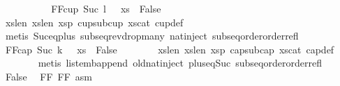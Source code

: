 \begin{isabellebody}
\ \ \ \ \isamarkupfalse%
\isanewline
\isanewline
\ \ \ \ \isamarkupfalse%
\ FF{}{\isacharcolon}{\kern0pt}{\isachardoublequoteopen}cup\ {\isacharparenleft}{\kern0pt}Suc\ {\isacharparenleft}{\kern0pt}l\ {\isacharplus}{\kern0pt}\ {}{\isacharparenright}{\kern0pt}{\isacharparenright}{\kern0pt}\ xs\ {\isasymLongrightarrow}\ False{\isachardoublequoteclose}\ \isanewline
\ \ \ \ \ \ \isamarkupfalse%
\ xs{\isacharunderscore}{\kern0pt}len\ xs{}{\isacharunderscore}{\kern0pt}len{}\ xs{}p{}\ cup{\isacharunderscore}{\kern0pt}sub{\isacharunderscore}{\kern0pt}cup\ xs{\isacharunderscore}{\kern0pt}cat\ cup{\isacharunderscore}{\kern0pt}def\isanewline
\ \ \ \ \ \ \isamarkupfalse%
\ {\isacharparenleft}{\kern0pt}metis\ Suc{\isacharunderscore}{\kern0pt}eq{\isacharunderscore}{\kern0pt}plus{}\ subseq{\isacharunderscore}{\kern0pt}rev{\isacharunderscore}{\kern0pt}drop{\isacharunderscore}{\kern0pt}many\ nat{\isachardot}{\kern0pt}inject\ subseq{\isacharunderscore}{\kern0pt}order{\isachardot}{\kern0pt}order{\isacharunderscore}{\kern0pt}refl{\isacharparenright}{\kern0pt}\isanewline
\isanewline
\ \ \ \ \isamarkupfalse%
\ FF{}{\isacharcolon}{\kern0pt}{\isachardoublequoteopen}cap\ {\isacharparenleft}{\kern0pt}Suc\ {\isacharparenleft}{\kern0pt}k\ {\isacharplus}{\kern0pt}\ {}{\isacharparenright}{\kern0pt}{\isacharparenright}{\kern0pt}\ xs\ {\isasymLongrightarrow}\ False{\isachardoublequoteclose}\isanewline
\ \ \ \ \ \ \isamarkupfalse%
\ xs{\isacharunderscore}{\kern0pt}len\ xs{}{\isacharunderscore}{\kern0pt}len{}\ xs{}p{}\ cap{\isacharunderscore}{\kern0pt}sub{\isacharunderscore}{\kern0pt}cap\ xs{\isacharunderscore}{\kern0pt}cat\ cap{\isacharunderscore}{\kern0pt}def\isanewline
\ \ \ \ \ \ \isamarkupfalse%
\ {\isacharparenleft}{\kern0pt}metis\ list{\isacharunderscore}{\kern0pt}emb{\isacharunderscore}{\kern0pt}append{}\ old{\isachardot}{\kern0pt}nat{\isachardot}{\kern0pt}inject\ plus{\isacharunderscore}{\kern0pt}{}{\isacharunderscore}{\kern0pt}eq{\isacharunderscore}{\kern0pt}Suc\ subseq{\isacharunderscore}{\kern0pt}order{\isachardot}{\kern0pt}order{\isacharunderscore}{\kern0pt}refl{\isacharparenright}{\kern0pt}\isanewline
\isanewline
\ \ \ \ \isamarkupfalse%
\ False\ \isamarkupfalse%
\ FF{}\ FF{}\ asm{\isacharparenleft}{\kern0pt}{}{\isacharparenright}{\kern0pt}\ \isamarkupfalse%

\end{isabellebody}
